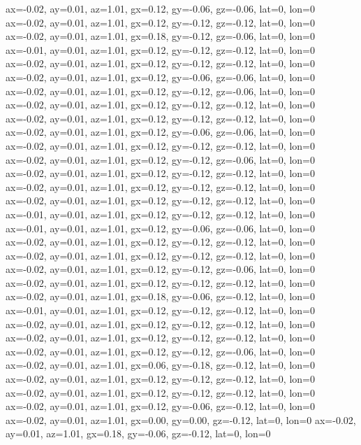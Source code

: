 ax=-0.02, ay=0.01, az=1.01, gx=0.12, gy=-0.06, gz=-0.06, lat=0, lon=0
ax=-0.02, ay=0.01, az=1.01, gx=0.12, gy=-0.12, gz=-0.12, lat=0, lon=0
ax=-0.02, ay=0.01, az=1.01, gx=0.18, gy=-0.12, gz=-0.06, lat=0, lon=0
ax=-0.01, ay=0.01, az=1.01, gx=0.12, gy=-0.12, gz=-0.12, lat=0, lon=0
ax=-0.02, ay=0.01, az=1.01, gx=0.12, gy=-0.12, gz=-0.12, lat=0, lon=0
ax=-0.02, ay=0.01, az=1.01, gx=0.12, gy=-0.06, gz=-0.06, lat=0, lon=0
ax=-0.02, ay=0.01, az=1.01, gx=0.12, gy=-0.12, gz=-0.06, lat=0, lon=0
ax=-0.02, ay=0.01, az=1.01, gx=0.12, gy=-0.12, gz=-0.12, lat=0, lon=0
ax=-0.02, ay=0.01, az=1.01, gx=0.12, gy=-0.12, gz=-0.12, lat=0, lon=0
ax=-0.02, ay=0.01, az=1.01, gx=0.12, gy=-0.06, gz=-0.06, lat=0, lon=0
ax=-0.02, ay=0.01, az=1.01, gx=0.12, gy=-0.12, gz=-0.12, lat=0, lon=0
ax=-0.02, ay=0.01, az=1.01, gx=0.12, gy=-0.12, gz=-0.06, lat=0, lon=0
ax=-0.02, ay=0.01, az=1.01, gx=0.12, gy=-0.12, gz=-0.12, lat=0, lon=0
ax=-0.02, ay=0.01, az=1.01, gx=0.12, gy=-0.12, gz=-0.12, lat=0, lon=0
ax=-0.02, ay=0.01, az=1.01, gx=0.12, gy=-0.12, gz=-0.12, lat=0, lon=0
ax=-0.01, ay=0.01, az=1.01, gx=0.12, gy=-0.12, gz=-0.12, lat=0, lon=0
ax=-0.01, ay=0.01, az=1.01, gx=0.12, gy=-0.06, gz=-0.06, lat=0, lon=0
ax=-0.02, ay=0.01, az=1.01, gx=0.12, gy=-0.12, gz=-0.12, lat=0, lon=0
ax=-0.02, ay=0.01, az=1.01, gx=0.12, gy=-0.12, gz=-0.12, lat=0, lon=0
ax=-0.02, ay=0.01, az=1.01, gx=0.12, gy=-0.12, gz=-0.06, lat=0, lon=0
ax=-0.02, ay=0.01, az=1.01, gx=0.12, gy=-0.12, gz=-0.12, lat=0, lon=0
ax=-0.02, ay=0.01, az=1.01, gx=0.18, gy=-0.06, gz=-0.12, lat=0, lon=0
ax=-0.01, ay=0.01, az=1.01, gx=0.12, gy=-0.12, gz=-0.12, lat=0, lon=0
ax=-0.02, ay=0.01, az=1.01, gx=0.12, gy=-0.12, gz=-0.12, lat=0, lon=0
ax=-0.02, ay=0.01, az=1.01, gx=0.12, gy=-0.12, gz=-0.12, lat=0, lon=0
ax=-0.02, ay=0.01, az=1.01, gx=0.12, gy=-0.12, gz=-0.06, lat=0, lon=0
ax=-0.02, ay=0.01, az=1.01, gx=0.06, gy=-0.18, gz=-0.12, lat=0, lon=0
ax=-0.02, ay=0.01, az=1.01, gx=0.12, gy=-0.12, gz=-0.12, lat=0, lon=0
ax=-0.02, ay=0.01, az=1.01, gx=0.12, gy=-0.12, gz=-0.12, lat=0, lon=0
ax=-0.02, ay=0.01, az=1.01, gx=0.12, gy=-0.06, gz=-0.12, lat=0, lon=0
ax=-0.02, ay=0.01, az=1.01, gx=0.00, gy=0.00, gz=-0.12, lat=0, lon=0
ax=-0.02, ay=0.01, az=1.01, gx=0.18, gy=-0.06, gz=-0.12, lat=0, lon=0